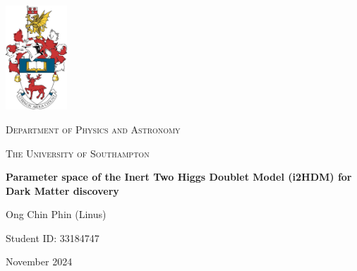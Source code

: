 \documentclass[12pt]{article}
\begin{document}
\titleformat{\section}{\large\bfseries}{\thesection}{0.5em}{}

\titleformat{\subsection}{\large\bfseries}{\thesubsection}{1em}{}

\begin{titlepage}
    \centering
    \includegraphics[width=2.3cm]{crest.jpg}\par
    \vspace{1cm}
    {\scshape\Large Department of Physics and Astronomy \par}
    \vspace{1cm}
    {\scshape\Large The University of Southampton \par}
    \vspace{1cm}
    \vspace{1cm}
    {\huge\bfseries Parameter space of the Inert Two Higgs Doublet Model (i2HDM) for Dark Matter discovery\par}
    \vspace{1cm}
    {\Large Ong Chin Phin (Linus) \par}
    \vspace{1cm}
    {\Large Student ID: 33184747 \par}
    \vfill
    {\large November 2024 \par}
\end{titlepage}

\newpage
\tableofcontents
\thispagestyle{empty}
\end{document}
